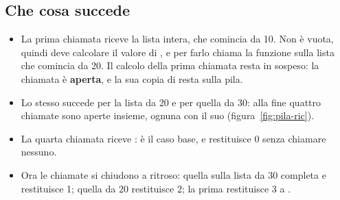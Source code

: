 \subsection{Che cosa succede}

\begin{itemize}
  \item La prima chiamata riceve la lista intera, che comincia da 10. Non è
        vuota, quindi deve calcolare il valore di
        , e per farlo chiama la funzione
        sulla lista che comincia da 20. Il
        calcolo della prima chiamata resta in sospeso: la chiamata è
        \textbf{aperta}, e la sua copia di  resta sulla pila.
  \item Lo stesso succede per la lista da 20 e per quella da 30: alla fine
        quattro chiamate sono aperte insieme, ognuna con il suo 
        (figura~\ref{fig:pila-ric}).
  \item La quarta chiamata riceve : è il caso base, e restituisce
        0 senza chiamare nessuno.
  \item Ora le chiamate si chiudono a ritroso: quella sulla lista da 30
        completa  e restituisce 1; quella da 20 restituisce 2; la
        prima restituisce 3 a .
\end{itemize}

